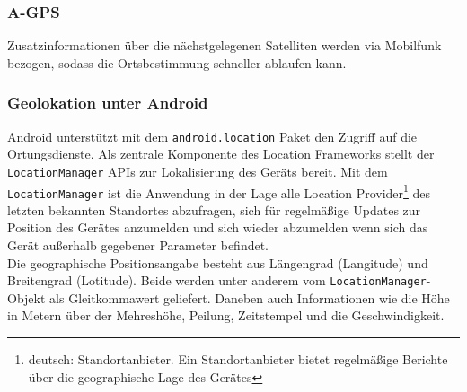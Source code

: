 \subsubsection{A-\gls{GPS}}
Zusatzinformationen über die nächstgelegenen Satelliten werden via Mobilfunk bezogen, sodass die Ortsbestimmung schneller ablaufen kann. 
\subsubsection{Geolokation unter Android}
Android unterstützt mit dem \texttt{android.location} Paket den Zugriff auf die Ortungsdienste. Als zentrale Komponente des Location Frameworks stellt der \texttt{LocationManager} \glspl{API} zur Lokalisierung des Geräts bereit. Mit dem \texttt{LocationManager} ist die Anwendung in der Lage alle Location Provider\footnote{ deutsch: Standortanbieter. Ein Standortanbieter bietet regelmäßige Berichte über die geographische Lage des Gerätes} des letzten bekannten Standortes abzufragen, sich für regelmäßige Updates zur Position des Gerätes anzumelden und sich wieder abzumelden wenn sich das Gerät außerhalb gegebener Parameter befindet. \cite{android_gps} \\
Die geographische Positionsangabe besteht aus Längengrad (Langitude) und Breitengrad (Lotitude). Beide werden unter anderem vom \texttt{LocationManager}-Objekt als Gleitkommawert geliefert. Daneben auch Informationen wie die Höhe in Metern über der Mehreshöhe, Peilung, Zeitstempel und die Geschwindigkeit.\\
\clearpage
